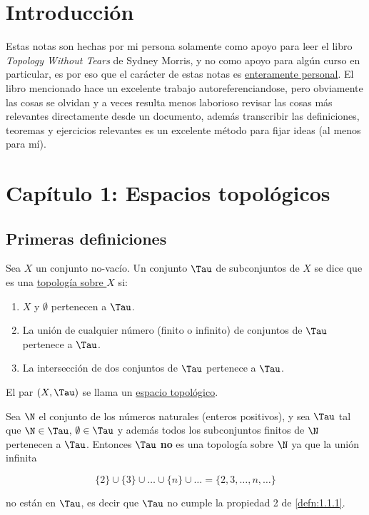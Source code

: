 \section{Introducción}

\begin{aco}
    Estas notas son hechas por mi persona solamente como apoyo para leer el libro \textit{Topology Without Tears} de Sydney Morris, y no como apoyo para algún curso en particular, es por eso que el carácter de estas notas es \ul{enteramente personal}. El libro mencionado hace un excelente trabajo autoreferenciandose, pero obviamente las cosas se olvidan y a veces resulta menos laborioso revisar las cosas más relevantes directamente desde un documento, además transcribir las definiciones, teoremas y ejercicios relevantes es un excelente método para fijar ideas (al menos para mí).
\end{aco}

\section{Capítulo 1: Espacios topológicos}
\setcounter{section}{1}

\subsection{Primeras definiciones}

\begin{defn}\label{defn:1.1.1}
    Sea $X$ un conjunto no-vacío. Un conjunto $\Tau$ de subconjuntos de $X$ se dice que es una \ul{topología sobre $X$} si:
    
    \begin{enumerate}
        \item $X$ y $\emptyset$ pertenecen a $\Tau$.
        \item La unión de cualquier número (finito o infinito) de conjuntos de $\Tau$ pertenece a $\Tau$.
        \item La intersección de dos conjuntos de $\Tau$ pertenece a $\Tau$.
    \end{enumerate}
    
    El par $(X, \Tau)$ se llama un \ul{espacio topológico}.
\end{defn}

\begin{ejem}
    Sea $\N$ el conjunto de los números naturales (enteros positivos), y sea $\Tau$ tal que $\N \in \Tau$, $\emptyset \in \Tau$ y además todos los subconjuntos finitos de $\N$ pertenecen a $\Tau$. Entonces $\Tau$ \textbf{no} es una topología sobre $\N$ ya que la unión infinita
    
    \[
    \{2\} \cup \{3\} \cup \dots \cup \{n\} \cup \dots = \{2, 3, \dots, n, \dots\}
    \]
    
    \noindent no están en $\Tau$, es decir que $\Tau$ no cumple la propiedad 2 de \ref{defn:1.1.1}.
\end{ejem}

